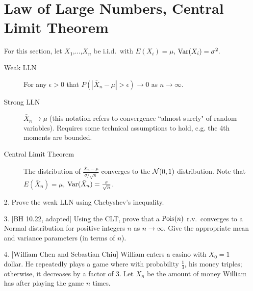 \documentclass{article}
\begin{document}
\section{Law of Large Numbers, Central Limit Theorem}
For this section, let $X_1$,...,$X_n$ be i.i.d.~with $E(X_i) = \mu$, $\textrm{Var}(X_i) = \sigma^2$.
\begin{description}
\item[Weak LLN] For any $\epsilon>0$ that $P(|\bar{X}_n-\mu| > \epsilon) \rightarrow 0$ as $n \rightarrow \infty$. 

\item[Strong LLN] $\bar{X}_n \rightarrow \mu$ (this notation refers to convergence ``almost surely" of random variables). Requires some technical assumptions to hold, e.g. the 4th moments are bounded.

\item[Central Limit Theorem] The distribution of $\frac{\bar{X}_n-\mu}{\sigma/\sqrt{n}}$ converges to the $\mathcal{N}(0,1)$ distribution. Note that $E(\bar{X}_n) = \mu$, $\textrm{Var}(\bar{X}_n) = \frac{\sigma}{\sqrt{n}}$. 

\end{description}

2. Prove the weak LLN using Chebyshev's inequality.


3. [BH 10.22, adapted] Using the CLT, prove that a $\textrm{Pois}(n)$ r.v.~converges to a Normal distribution for positive integers $n$ as $n \rightarrow \infty$. Give the appropriate mean and variance parameters (in terms of $n$). 


4. [William Chen and Sebastian Chiu] William enters a casino with $X_0=1$ dollar. He repeatedly plays a game where with probability $\frac{1}{3}$, his money triples; otherwise, it decreases by a factor of $3$. Let $X_n$ be the amount of money William has after playing the game $n$ times. 
\end{document}
